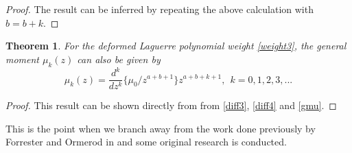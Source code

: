 \documentclass[12pt]{article}
\newtheorem{mydef}{Theorem}[section]
\numberwithin{figure}{section}
\numberwithin{equation}{section}
\numberwithin{table}{section}
\begin{document}
\begin{proof}
The result can be inferred by repeating the above calculation with $ b= b+k$.
\end{proof}
\begin{mydef}
For the deformed Laguerre polynomial weight \eqref{weight3}, the  general moment $\mu_k(z)$ can also be given by
\begin{equation}\nonumber
\mu_k(z)=\frac{d^{k}}{dz^{k}}\big\{\mu_{0}/z^{a+b+1}\big\}z^{a+b+k+1},~~k=0,1,2,3,...
\end{equation}
\end{mydef}
\begin{proof}
This result can be shown directly from from \eqref{diff3}, \eqref{diff4} and \eqref{gmu}.
\end{proof}
This is the point when we branch away from the work done previously by Forrester and Ormerod in \cite{Ormerod} and some original research is conducted.
\end{document}
